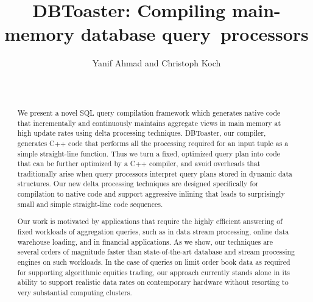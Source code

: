 \documentclass{vldb}
\title{DBToaster: Compiling main-memory database query~processors}
\author{
\alignauthor Yanif Ahmad and Christoph Koch \\
\affaddr{Department of Computer Science} \\
\affaddr{Cornell University, Ithaca, NY} \\
\email{\{yanif, koch\}@cs.cornell.edu}}
\date{}
\begin{document}
\maketitle


\begin{abstract}
We  present a novel  SQL query  compilation framework  which generates native 
code that incrementally  and continuously  maintains aggregate views  in main 
memory at  high  update rates  using delta  processing techniques. DBToaster, 
our compiler, generates C++  code that  performs all the  processing required 
for an input  tuple as  a simple  straight-line function. Thus we turn  a fixed,
optimized query plan into code that can be further optimized by a C++ compiler,
and avoid overheads that traditionally arise when query processors interpret
query plans stored in dynamic data structures. Our new delta processing
techniques are designed specifically for compilation to native code and support
aggressive inlining that leads to surprisingly small and simple straight-line
code sequences.

Our  work  is  motivated  by  applications  that  require  the  highly
efficient answering of fixed workloads of aggregation queries, such as
in  data stream  processing,  online data  warehouse  loading, and  in
financial applications. As we  show, our techniques are several orders
of  magnitude   faster  than  state-of-the-art   database  and  stream
processing engines on such workloads.  In the case of queries on limit
order  book  data  as  required for  supporting  algorithmic  equities
trading, our approach currently stands alone in its ability to support
realistic  data rates  on contemporary  hardware without  resorting to
very substantial computing clusters.
\end{abstract}










\small{


}
\end{document}
